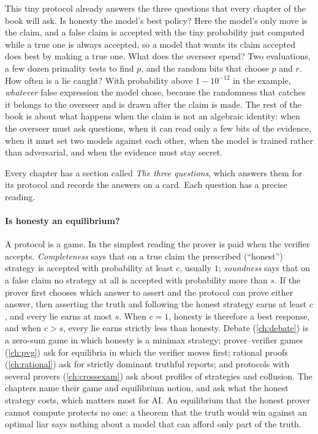 \begin{refsection}
This tiny protocol already answers the three questions that every chapter of the book will ask. Is honesty the model's best policy? Here the model's only move is the claim, and a false claim is accepted with the tiny probability just computed while a true one is always accepted, so a model that wants its claim accepted does best by making a true one. What does the overseer spend? Two evaluations, a few dozen primality tests to find $p$, and the random bits that choose $p$ and $r$. How often is a lie caught? With probability above $1-10^{-12}$ in the example, \emph{whatever} false expression the model chose, because the randomness that catches it belongs to the overseer and is drawn after the claim is made. The rest of the book is about what happens when the claim is not an algebraic identity: when the overseer must ask questions, when it can read only a few bits of the evidence, when it must set two models against each other, when the model is trained rather than adversarial, and when the evidence must stay secret.


Every chapter has a section called \emph{The three questions}, which answers them for its protocol and records the answers on a card. Each question has a precise reading.

\paragraph{Is honesty an equilibrium?} A protocol is a game. In the simplest reading the prover is paid when the verifier accepts. \emph{Completeness} says that on a true claim the prescribed (``honest'') strategy is accepted with probability at least $c$, usually $1$; \emph{soundness} says that on a false claim no strategy at all is accepted with probability more than $s$. If the prover first chooses which answer to assert and the protocol can prove either answer, then asserting the truth and following the honest strategy earns at least $c$, and every lie earns at most $s$. When $c=1$, honesty is therefore a best response, and when $c>s$, every lie earns strictly less than honesty. Debate (\cref{ch:debate}) is a zero-sum game in which honesty is a minimax strategy; prover–verifier games (\cref{ch:pvg}) ask for equilibria in which the verifier moves first; rational proofs (\cref{ch:rational}) ask for strictly dominant truthful reports; and protocols with several provers (\cref{ch:crossexam}) ask about profiles of strategies and collusion. The chapters name their game and equilibrium notion, and ask what the honest strategy costs, which matters most for AI. An equilibrium that the honest prover cannot compute protects no one: a theorem that the truth would win against an optimal liar says nothing about a model that can afford only part of the truth.


\end{refsection}
